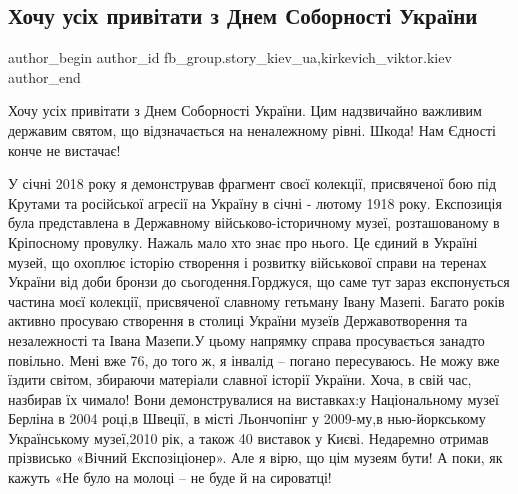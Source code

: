  
 
 
 
 
 
\subsection{Хочу усіх привітати з Днем Соборності України}
\label{sec:22_01_2022.fb.fb_group.story_kiev_ua.1.den_sobornosti_ukrainy}
 
\ifcmt
 author_begin
   author_id fb_group.story_kiev_ua,kirkevich_viktor.kiev
 author_end
\fi

Хочу усіх привітати з Днем Соборності України. Цим надзвичайно важливим
державим святом, що відзначається на неналежному рівні. Шкода! Нам Єдності конче
не вистачає!

У січні 2018 року я демонстрував фрагмент своєї колекції, присвяченої бою під
Крутами та російської агресії на Україну в січні - лютому 1918 року. Експозиція
була представлена в Державному військово-історичному музеї, розташованому в
Кріпосному провулку. Нажаль мало хто знає про нього. Це єдиний в Україні музей,
що охоплює історію створення і розвитку військової справи на теренах України
від доби бронзи до сьогодення.Горджуся, що саме тут зараз експонується частина
моєї колекції, присвяченої славному гетьману Івану Мазепі. Багато років активно
просуваю створення в столиці України музеїв Державотворення та незалежності та
Івана Мазепи.У цьому напрямку справа просувається занадто повільно. Мені вже
76, до того ж, я інвалід – погано пересуваюсь. Не можу вже їздити світом,
збираючи матеріали славної історії України. Хоча, в свій час, назбирав їх
чимало! Вони демонструвалися на виставках:у Національному музеї Берліна в 2004
році,в Швеції, в місті Льончопінг у 2009-му,в нью-йоркському Українському
музеї,2010 рік, а також 40 виставок у Києві. Недаремно отримав прізвисько
«Вічний Експозіціонер». Але я вірю, що цім музеям бути! А поки, як кажуть «Не
було на молоці – не буде й на сироватці!

